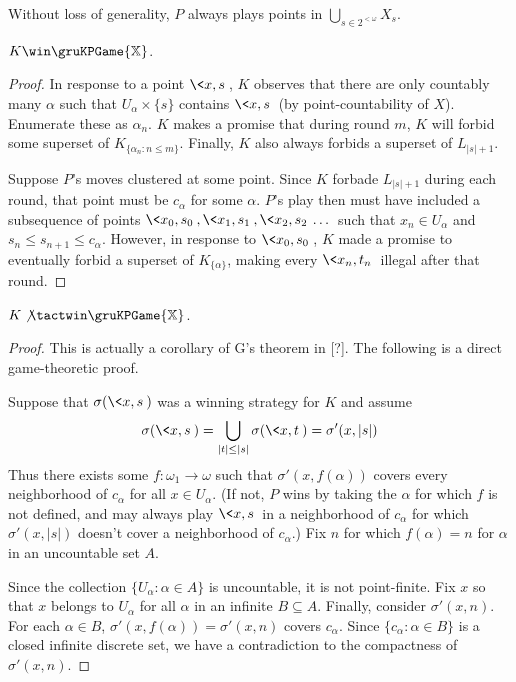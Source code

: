 \begin{prop}
Without loss of generality, $P$ always plays points in $\bigcup_{s \in 2^{<\omega}} X_s$.
\end{prop}

\begin{prop}
$K \win \gruKPGame{\mathbb{X}}$.
\end{prop}

\begin{proof}
In response to a point $\<x,s\>$, $K$ observes that there are only countably many $\alpha$ such that $U_\alpha \times \{s\}$ contains $\<x,s\>$ (by point-countability of $X$). Enumerate these as $\alpha_n$. $K$ makes a promise that during round $m$, $K$ will forbid some superset of $K_{\{\alpha_n : n\leq m\}}$. Finally, $K$ also always forbids a superset of $L_{|s|+1}$.

Suppose $P$'s moves clustered at some point. Since $K$ forbade $L_{|s|+1}$ during each round, that point must be $c_\alpha$ for some $\alpha$. $P$'s play then must have included a subsequence of points $\<x_0,s_0\>,\<x_1,s_1\>,\<x_2,s_2\>\dots$ such that $x_n \in U_\alpha$ and $s_n \leq s_{n+1} \leq c_\alpha$. However, in response to $\<x_0,s_0\>$, $K$ made a promise to eventually forbid a superset of $K_{\{\alpha\}}$, making every $\<x_n,t_n\>$ illegal after that round.
\end{proof}

\begin{thm}
$K\not\tactwin\gruKPGame{\mathbb{X}}$.
\end{thm}

\begin{proof}
This is actually a corollary of G's theorem in [?]. The following is a direct game-theoretic proof.

Suppose that $\sigma(\<x,s\>)$ was a winning strategy for $K$ and assume
  \[
    \sigma(\<x,s\>) = \bigcup_{|t|\leq |s|} \sigma(\<x,t\>) = \sigma'(x,|s|)
  \]
Thus there exists some $f: \omega_1 \to \omega$ such that $\sigma'(x,f(\alpha))$ covers every neighborhood of $c_\alpha$ for all $x\in U_\alpha$. (If not, $P$ wins by taking the $\alpha$ for which $f$ is not defined, and may always play $\<x,s\>$ in a neighborhood of $c_\alpha$ for which $\sigma'(x,|s|)$ doesn't cover a neighborhood of $c_\alpha$.) Fix $n$ for which $f(\alpha)=n$ for $\alpha$ in an uncountable set $A$.

Since the collection $\{U_\alpha : \alpha \in A\}$ is uncountable, it is not point-finite. Fix $x$ so that $x$ belongs to $U_\alpha$ for all $\alpha$ in an infinite $B \subseteq A$. Finally, consider $\sigma'(x,n)$. For each $\alpha\in B$, $\sigma'(x,f(\alpha))=\sigma'(x,n)$ covers $c_\alpha$. Since $\{c_\alpha : \alpha \in B\}$ is a closed infinite discrete set, we have a contradiction to the compactness of $\sigma'(x,n)$.
\end{proof}



